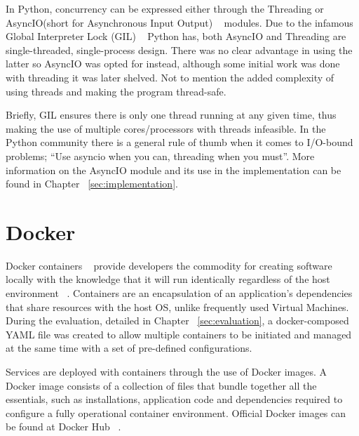 In Python, concurrency can be expressed either through the Threading or AsyncIO(short for Asynchronous Input Output) ~\cite{asyncio} modules. Due to the infamous Global Interpreter Lock (GIL) ~\cite{gil_realpython} Python has, both AsyncIO and Threading are single-threaded, single-process design. There was no clear advantage in using the latter so AsyncIO was opted for instead, although some initial work was done with threading it was later shelved. Not to mention the added complexity of using threads and making the program thread-safe. 

Briefly, GIL ensures there is only one thread running at any given time, thus making the use of multiple cores/processors with threads infeasible. In the Python community there is a general rule of thumb when it comes to I/O-bound problems; “Use asyncio when you can, threading when you must”. More information on the AsyncIO module and its use in the \pname implementation can be found in Chapter ~\ref{sec:implementation}.

\section{Docker}
Docker containers ~\cite{docker_containers} provide developers the commodity for creating software locally with the knowledge that it will run identically regardless of the host environment ~\cite{using_docker_book}. Containers are an encapsulation of an application's dependencies that share resources with the host OS, unlike frequently used Virtual Machines. During the evaluation, detailed in Chapter ~\ref{sec:evaluation}, a docker-composed YAML file was created to allow multiple containers to be initiated and managed at the same time with a set of pre-defined configurations. 

Services are deployed with containers through the use of Docker images. A Docker image consists of a collection of files that bundle together all the essentials, such as installations, application code and dependencies required to configure a fully operational container environment. Official Docker images can be found at Docker Hub ~\cite{docker_hub}.